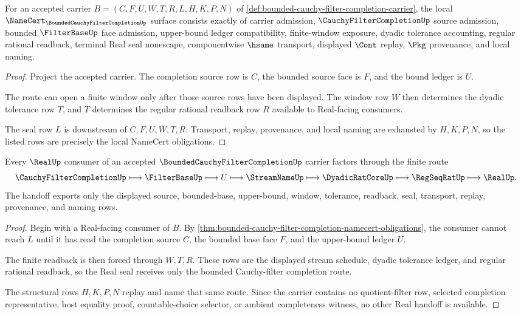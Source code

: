 \begin{theorem}
\label{thm:bounded-cauchy-filter-completion-namecert-obligations}
For an accepted carrier $B=(C,F,U,W,T,R,L,H,K,P,N)$ of \autoref{def:bounded-cauchy-filter-completion-carrier}, the local $\NameCert_{\BoundedCauchyFilterCompletionUp}$ surface consists exactly of carrier admission, $\CauchyFilterCompletionUp$ source admission, bounded $\FilterBaseUp$ face admission, upper-bound ledger compatibility, finite-window exposure, dyadic tolerance accounting, regular rational readback, terminal Real seal nonescape, componentwise $\hsame$ transport, displayed $\Cont$ replay, $\Pkg$ provenance, and local naming.
\end{theorem}
\begin{proof}
Project the accepted carrier. The completion source row is $C$, the bounded source face is $F$, and the bound ledger is $U$.

The route can open a finite window only after those source rows have been displayed. The window row $W$ then determines the dyadic tolerance row $T$, and $T$ determines the regular rational readback row $R$ available to Real-facing consumers.

The seal row $L$ is downstream of $C,F,U,W,T,R$. Transport, replay, provenance, and local naming are exhausted by $H,K,P,N$, so the listed rows are precisely the local NameCert obligations.
\end{proof}

\begin{theorem}
\label{thm:bounded-cauchy-filter-completion-real-handoff}
Every $\RealUp$ consumer of an accepted $\BoundedCauchyFilterCompletionUp$ carrier factors through the finite route
$$
\CauchyFilterCompletionUp \longmapsto \FilterBaseUp \longmapsto U \longmapsto \StreamNameUp \longmapsto \DyadicRatCoreUp \longmapsto \RegSeqRatUp \longmapsto \RealUp .
$$
The handoff exports only the displayed source, bounded-base, upper-bound, window, tolerance, readback, seal, transport, replay, provenance, and naming rows.
\end{theorem}
\begin{proof}
Begin with a Real-facing consumer of $B$. By \autoref{thm:bounded-cauchy-filter-completion-namecert-obligations}, the consumer cannot reach $L$ until it has read the completion source $C$, the bounded base face $F$, and the upper-bound ledger $U$.

The finite readback is then forced through $W,T,R$. These rows are the displayed stream schedule, dyadic tolerance ledger, and regular rational readback, so the Real seal receives only the bounded Cauchy-filter completion route.

The structural rows $H,K,P,N$ replay and name that same route. Since the carrier contains no quotient-filter row, selected completion representative, host equality proof, countable-choice selector, or ambient completeness witness, no other Real handoff is available.
\end{proof}

